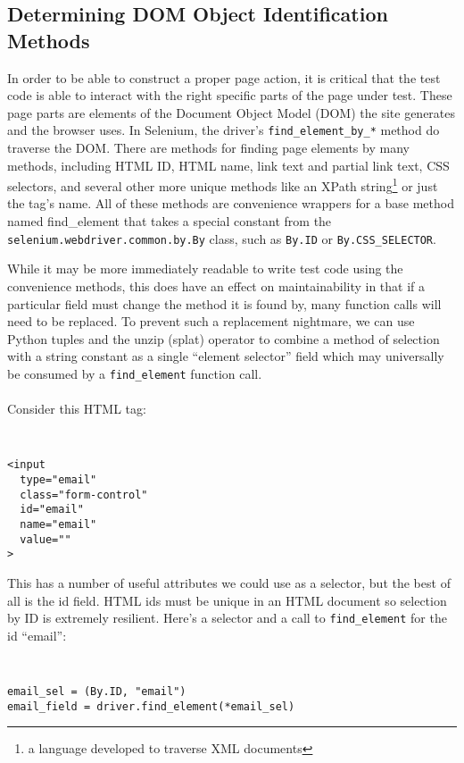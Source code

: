 \subsection{Determining DOM Object Identification Methods}
In order to be able to construct a proper page action, it is critical that the test code is able to interact with the right specific parts of the page under test. These page parts are elements of the Document Object Model (DOM) the site generates and the browser uses. In Selenium, the driver's \texttt{find\_element\_by\_*} method do traverse the DOM. There are methods for finding page elements by many methods, including HTML ID, HTML name, link text and partial link text, CSS selectors, and several other more unique methods like an XPath string\footnote{a language developed to traverse XML documents} or just the tag's name. All of these methods are convenience wrappers for a base method named find\_element that takes a special constant from the \texttt{selenium.webdriver.common.by.By} class, such as \texttt{By.ID} or \texttt{By.CSS\_SELECTOR}.

While it may be more immediately readable to write test code using the convenience methods, this does have an effect on maintainability in that if a particular field must change the method it is found by, many function calls will need to be replaced.\citep{gupta2003dom} To prevent such a replacement nightmare, we can use Python tuples and the unzip (splat) operator to combine a method of selection with a string constant as a single ``element selector'' field which may universally be consumed by a \texttt{find\_element} function call.
\\\\
Consider this HTML tag:

{\tt
\begin{verbatim}
<input
  type="email"
  class="form-control"
  id="email"
  name="email"
  value=""
>
\end{verbatim}
}

This has a number of useful attributes we could use as a selector, but the best of all is the id field. HTML ids must be unique in an HTML document \citep{HTMLStan99} so selection by ID is extremely resilient. Here's a selector and a call to \texttt{find\_element} for the id ``email'':

{\tt
\begin{verbatim}
email_sel = (By.ID, "email")
email_field = driver.find_element(*email_sel)
\end{verbatim}
}

